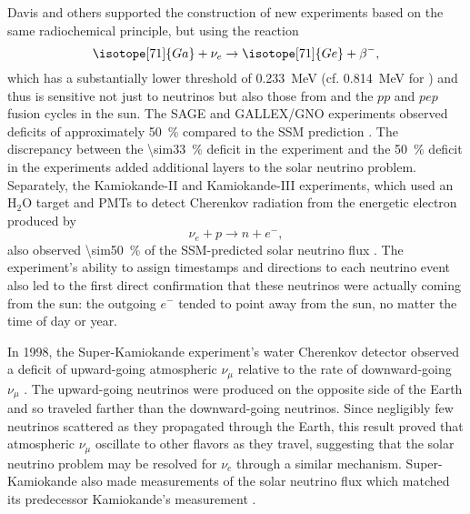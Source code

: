 Davis and others supported the construction of
new experiments based on the same radiochemical principle,
but using the reaction
\begin{equation}\label{eq:gallium}
    \isotope[71]{Ga} + \nu_e \to \isotope[71]{Ge} + \beta^-,
\end{equation}
which has a substantially lower threshold
of \SI{0.233}{\MeV} (cf. \SI{0.814}{\MeV} for )
and thus is sensitive not just to  neutrinos
but also those from  and the $pp$ and $pep$ fusion cycles in the sun.
The SAGE and GALLEX/GNO experiments observed deficits of approximately \SI{50}{\percent}
compared to the SSM prediction \cite{sage,gallex}.
The discrepancy between the \SI{\sim33}{\percent} deficit
in the  experiment
and the \SI{50}{\percent} deficit in the  experiments
added additional layers to the solar neutrino problem.
Separately, the Kamiokande-II and Kamiokande-III experiments,
which used an $\text{H}_2\text{O}$ target
and PMTs to detect Cherenkov radiation from the energetic electron produced by
\begin{equation}\label{eq:kamiokande}
    \nu_e + p \to n + e^-,
\end{equation}
also observed \SI{\sim50}{\percent} of the SSM-predicted solar neutrino flux
\cite{kamiokande_III}.
The experiment's ability to assign timestamps and directions to each neutrino event
also led to the first direct confirmation that these neutrinos
were actually coming from the sun:
the outgoing $e^-$ tended to point away from the sun,
no matter the time of day or year.

In 1998, the Super-Kamiokande experiment's water Cherenkov detector
observed a deficit of upward-going atmospheric $\nu_\mu$
relative to the rate of downward-going $\nu_\mu$ \cite{superk1998}.
The upward-going neutrinos were produced on the opposite side of the Earth
and so traveled farther than the downward-going neutrinos.
Since negligibly few neutrinos scattered as they propagated through the Earth,
this result proved that atmospheric $\nu_\mu$ oscillate to other flavors
as they travel,
suggesting that the solar neutrino problem may be resolved for $\nu_e$
through a similar mechanism.
Super-Kamiokande also made measurements of the solar neutrino flux
which matched its predecessor Kamiokande's measurement
\cite{superk_solar1998,superk_solar2001}.


